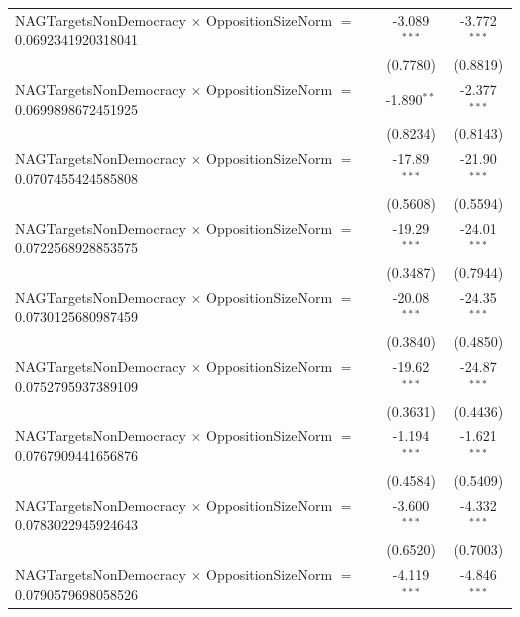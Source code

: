 \begin{tabular}{lcc}
   NAGTargetsNonDemocracy $\times$ OppositionSizeNorm $=$ 0.0692341920318041    & -3.089$^{***}$       & -3.772$^{***}$\\   
                                                                                & (0.7780)             & (0.8819)\\   
   NAGTargetsNonDemocracy $\times$ OppositionSizeNorm $=$ 0.0699898672451925    & -1.890$^{**}$        & -2.377$^{***}$\\   
                                                                                & (0.8234)             & (0.8143)\\   
   NAGTargetsNonDemocracy $\times$ OppositionSizeNorm $=$ 0.0707455424585808    & -17.89$^{***}$       & -21.90$^{***}$\\   
                                                                                & (0.5608)             & (0.5594)\\   
   NAGTargetsNonDemocracy $\times$ OppositionSizeNorm $=$ 0.0722568928853575    & -19.29$^{***}$       & -24.01$^{***}$\\   
                                                                                & (0.3487)             & (0.7944)\\   
   NAGTargetsNonDemocracy $\times$ OppositionSizeNorm $=$ 0.0730125680987459    & -20.08$^{***}$       & -24.35$^{***}$\\   
                                                                                & (0.3840)             & (0.4850)\\   
   NAGTargetsNonDemocracy $\times$ OppositionSizeNorm $=$ 0.0752795937389109    & -19.62$^{***}$       & -24.87$^{***}$\\   
                                                                                & (0.3631)             & (0.4436)\\   
   NAGTargetsNonDemocracy $\times$ OppositionSizeNorm $=$ 0.0767909441656876    & -1.194$^{***}$       & -1.621$^{***}$\\   
                                                                                & (0.4584)             & (0.5409)\\   
   NAGTargetsNonDemocracy $\times$ OppositionSizeNorm $=$ 0.0783022945924643    & -3.600$^{***}$       & -4.332$^{***}$\\   
                                                                                & (0.6520)             & (0.7003)\\   
   NAGTargetsNonDemocracy $\times$ OppositionSizeNorm $=$ 0.0790579698058526    & -4.119$^{***}$       & -4.846$^{***}$\\   

\end{tabular}
